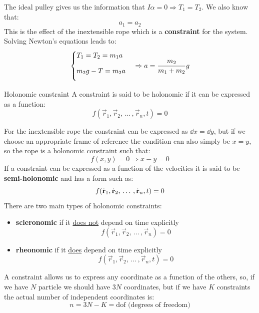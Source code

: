 The ideal pulley gives us the information that $I\alpha = 0 \Rightarrow T_1 = T_2$. We also know that:
\[a_1 = a_2\]
This is the effect of the inextensible rope which is a \textbf{constraint} for the system. Solving Newton's equations leads to:
\begin{equation}
    \centering
\begin{cases}
T_1=T_2=m_1a \\[8pt]
m_2g -T =m_2a \\[8pt]
\end{cases} \Rightarrow a = \dfrac{m_2}{m_1+m_2}g
\end{equation}
\begin{definition}{Holonomic constraint}
  A constraint is said to be holonomic if it can be expressed as a function:
  \begin{equation}
    f(\vec{r}_1,\vec{r}_2, \,\dots\, ,\vec{r}_n,t) = 0
  \end{equation}
\end{definition}
For the inextensible rope the constraint can be expressed as $\dd{x}=\dd{y}$, but if we choose an appropriate frame of reference the condition can also simply be $x=y$, so the rope is a holonomic constraint such that:
\begin{equation}
    f(x,y)=0 \Rightarrow x-y=0
\end{equation}
If a constraint can be expressed as a function of the velocities it is said to be \textbf{semi-holonomic} and has a form such as:
\begin{equation}
    f(\dot{\vb{r}}_1,\dot{\vb{r}}_2, \,\dots\, ,\dot{\vb{r}}_n,t) = 0
\end{equation}
There are two main types of holonomic constraints:
\begin{itemize}
    \item \textbf{scleronomic} if it \underline{does not} depend on time explicitly \[f(\vec{r}_1,\vec{r}_2, \,\dots\, ,\vec{r}_n) = 0\]
    \item \textbf{rheonomic} if it \underline{does} depend on time explicitly \[f(\vec{r}_1,\vec{r}_2, \,\dots\, ,\vec{r}_n,t) = 0\]
\end{itemize}
A constraint allows us to express any coordinate as a function of the others, so, if we have $N$ particle we should have $3N$ coordinates, but if we have $K$ constraints the actual number of independent coordinates is:
\begin{equation}
    n = 3N-K = \text{dof (degrees of freedom)}
\end{equation}
